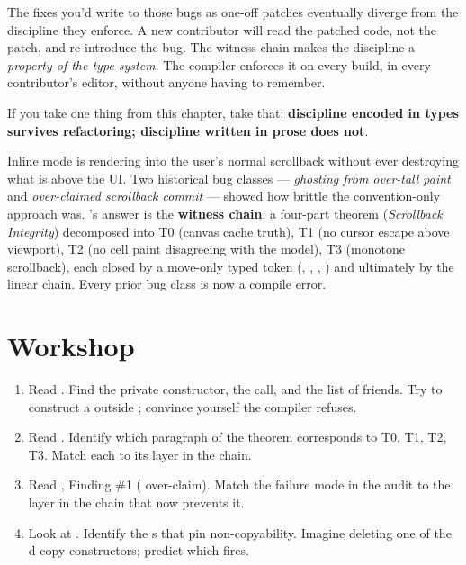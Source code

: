 The fixes you'd write to those bugs as one-off patches eventually
diverge from the discipline they enforce. A new contributor will
read the patched code, not the patch, and re-introduce the bug. The
witness chain makes the discipline a \emph{property of the type
system}. The compiler enforces it on every build, in every
contributor's editor, without anyone having to remember.

If you take one thing from this chapter, take that:
\textbf{discipline encoded in types survives refactoring;
discipline written in prose does not}.

\begin{recap}
Inline mode is rendering into the user's normal scrollback without
ever destroying what is above the UI. Two historical bug classes
--- \emph{ghosting from over-tall paint} and \emph{over-claimed
scrollback commit} --- showed how brittle the convention-only
approach was. \maya{}'s answer is the \textbf{witness chain}: a
four-part theorem (\emph{Scrollback Integrity}) decomposed into T0
(canvas cache truth), T1 (no cursor escape above viewport), T2
(no cell paint disagreeing with the model), T3 (monotone
scrollback), each closed by a move-only typed token (,
, , ) and
ultimately by the  linear chain. Every
prior bug class is now a compile error.
\end{recap}

\section*{Workshop}

\begin{enumerate}[leftmargin=*]
  \item Read . Find
    the private constructor, the  call, and the
    list of friends. Try to construct a  outside
    ; convince yourself the compiler refuses.
  \item Read . Identify
    which paragraph of the theorem corresponds to T0, T1, T2, T3.
    Match each to its layer in the chain.
  \item Read ,
    Finding \#1 ( over-claim). Match the
    failure mode in the audit to the layer in the chain that now
    prevents it.
  \item Look at . Identify
    the s that pin non-copyability. Imagine
    deleting one of the d copy constructors; predict
    which  fires.
\end{enumerate}
